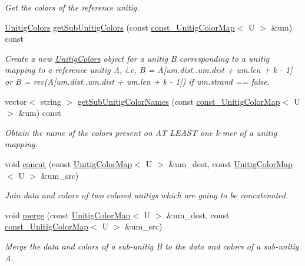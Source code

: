\begin{DoxyCompactItemize}
\begin{DoxyCompactList}\small\item\em Get the colors of the reference unitig. \end{DoxyCompactList}\item 
\hyperlink{classUnitigColors}{Unitig\+Colors} \hyperlink{classDataAccessor_aec000525e0b4fee736de1acc0630370b}{get\+Sub\+Unitig\+Colors} (const \hyperlink{classUnitigMap}{const\+\_\+\+Unitig\+Color\+Map}$<$ U $>$ \&um) const
\begin{DoxyCompactList}\small\item\em Create a new \hyperlink{classUnitigColors}{Unitig\+Colors} object for a unitig B corresponding to a unitig mapping to a reference unitig A, i.\+e, B = A\mbox{[}um.\+dist..um.\+dist + um.\+len + k -\/ 1\mbox{]} or B = rev(A\mbox{[}um.\+dist..um.\+dist + um.\+len + k -\/ 1\mbox{]}) if um.\+strand == false. \end{DoxyCompactList}\item 
vector$<$ string $>$ \hyperlink{classDataAccessor_aedfbec507c081058102923cfe0fb5724}{get\+Sub\+Unitig\+Color\+Names} (const \hyperlink{classUnitigMap}{const\+\_\+\+Unitig\+Color\+Map}$<$ U $>$ \&um) const
\begin{DoxyCompactList}\small\item\em Obtain the name of the colors present on AT L\+E\+A\+ST one k-\/mer of a unitig mapping. \end{DoxyCompactList}\item 
void \hyperlink{classDataAccessor_a42b319c9eb802a3a9276227c00f69665}{concat} (const \hyperlink{classUnitigMap}{Unitig\+Color\+Map}$<$ U $>$ \&um\+\_\+dest, const \hyperlink{classUnitigMap}{Unitig\+Color\+Map}$<$ U $>$ \&um\+\_\+src)
\begin{DoxyCompactList}\small\item\em Join data and colors of two colored unitigs which are going to be concatenated. \end{DoxyCompactList}\item 
void \hyperlink{classDataAccessor_a662c0fa811a55a750f32fbb7db3bef5c}{merge} (const \hyperlink{classUnitigMap}{Unitig\+Color\+Map}$<$ U $>$ \&um\+\_\+dest, const \hyperlink{classUnitigMap}{const\+\_\+\+Unitig\+Color\+Map}$<$ U $>$ \&um\+\_\+src)
\begin{DoxyCompactList}\small\item\em Merge the data and colors of a sub-\/unitig B to the data and colors of a sub-\/unitig A. \end{DoxyCompactList}\item 

\end{DoxyCompactItemize}
